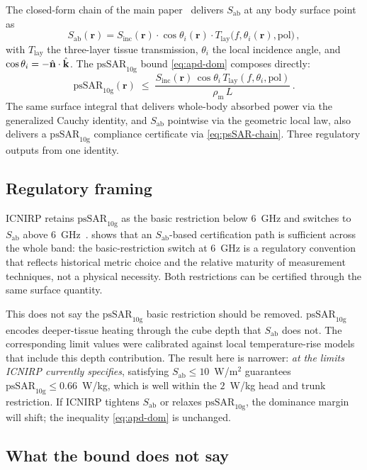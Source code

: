 \documentclass[11pt,a4paper]{article}
\theoremstyle{definition}
\theoremstyle{remark}
\newcommand{\Sinc}{S_{\mathrm{inc}}}
\newcommand{\APD}{S_{\mathrm{ab}}}
\newcommand{\Tlay}{T_{\mathrm{lay}}}
\newcommand{\nhat}{\hat{\vb{n}}}
\newcommand{\khat}{\hat{\vb{k}}}
\newcommand{\psSAR}{\ensuremath{\mathrm{psSAR}_{10\mathrm{g}}}}
\newcommand{\rhom}{\rho_{\mathrm{m}}}
\begin{document}
The closed-form chain of the main paper~\cite{TAP_paper} delivers
$\APD$ at any body surface point as
\begin{equation}\label{eq:APD-chain}
  \APD(\mathbf{r}) = \Sinc(\mathbf{r}) \cdot \cos\theta_i(\mathbf{r}) \cdot
  \Tlay\bigl(f, \theta_i(\mathbf{r}), \mathrm{pol}\bigr)\, ,
\end{equation}
with $\Tlay$ the three-layer tissue transmission, $\theta_i$ the local
incidence angle, and $\cos\theta_i = -\nhat \cdot \khat$. The $\psSAR$
bound \cref{eq:apd-dom} composes directly:
\begin{equation}\label{eq:psSAR-chain}
  \psSAR(\mathbf{r}) \;\le\; \frac{\Sinc(\mathbf{r})\,\cos\theta_i\,
  \Tlay(f, \theta_i, \mathrm{pol})}{\rhom\,L}\, .
\end{equation}
The same surface integral that delivers whole-body absorbed power via
the generalized Cauchy identity, and $\APD$ pointwise via the geometric
local law, also delivers a $\psSAR$ compliance certificate via
\cref{eq:psSAR-chain}. Three regulatory outputs from one identity.

\subsection{Regulatory framing}

ICNIRP retains $\psSAR$ as the basic restriction below $6$~GHz and
switches to $\APD$ above $6$~GHz~\cite{ICNIRP2020}. 
shows that an $\APD$-based certification path is sufficient across the
whole band: the basic-restriction switch at $6$~GHz is a regulatory
convention that reflects historical metric choice and the relative
maturity of measurement techniques, not a physical necessity. Both
restrictions can be certified through the same surface quantity.

This does not say the $\psSAR$ basic restriction should be removed.
$\psSAR$ encodes deeper-tissue heating through the cube depth that
$\APD$ does not. The corresponding limit values were calibrated against
local temperature-rise models that include this depth contribution. The
result here is narrower: \emph{at the limits ICNIRP currently
specifies}, satisfying $\APD \le 10$~W/m$^2$ guarantees
$\psSAR \le 0.66$~W/kg, which is well within the
$2$~W/kg head and trunk restriction. If ICNIRP tightens
$\APD$ or relaxes $\psSAR$, the dominance margin will shift; the
inequality \cref{eq:apd-dom} is unchanged.

\subsection{What the bound does not say}
\end{document}
